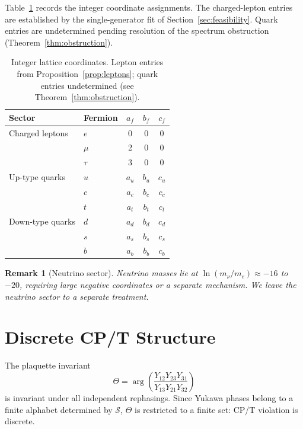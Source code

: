 ﻿\documentclass[11pt]{article}
\newtheorem{remark}[theorem]{Remark}
\begin{document}
Table~\ref{tab:coords} records the integer coordinate assignments. The
charged-lepton entries are established by the single-generator fit of
Section~\ref{sec:feasibility}. Quark entries are undetermined pending
resolution of the spectrum obstruction (Theorem~\ref{thm:obstruction}).

\begin{table}[h]
\centering
\begin{tabular}{llccc}
\toprule
Sector & Fermion & $a_f$ & $b_f$ & $c_f$ \\
\midrule
Charged leptons & $e$ & 0 & 0 & 0 \\
 & $\mu$ & 2 & 0 & 0 \\
 & $\tau$ & 3 & 0 & 0 \\
\midrule
Up-type quarks & $u$ & $a_u$ & $b_u$ & $c_u$ \\
 & $c$ & $a_c$ & $b_c$ & $c_c$ \\
 & $t$ & $a_t$ & $b_t$ & $c_t$ \\
\midrule
Down-type quarks & $d$ & $a_d$ & $b_d$ & $c_d$ \\
 & $s$ & $a_s$ & $b_s$ & $c_s$ \\
 & $b$ & $a_b$ & $b_b$ & $c_b$ \\
\bottomrule
\end{tabular}
\caption{Integer lattice coordinates. Lepton entries from
Proposition~\ref{prop:leptons}; quark entries undetermined
(see Theorem~\ref{thm:obstruction}).}
\label{tab:coords}
\end{table}

\begin{remark}[Neutrino sector]\label{rem:neutrinos}
Neutrino masses lie at $\ln(m_\nu/m_e)\approx-16$ to $-20$, requiring
large negative coordinates or a separate mechanism. We leave the neutrino
sector to a separate treatment.
\end{remark}

\section{Discrete CP/T Structure}
\label{sec:cp}

The plaquette invariant
\begin{equation}\label{eq:plaquette}
\Theta=\arg\!\left(\frac{Y_{12}Y_{23}Y_{31}}{Y_{13}Y_{21}Y_{32}}\right)
\end{equation}
is invariant under all independent rephasings. Since Yukawa phases belong
to a finite alphabet determined by $\mathcal{S}$, $\Theta$ is restricted
to a finite set: CP/T violation is discrete.
\end{document}
